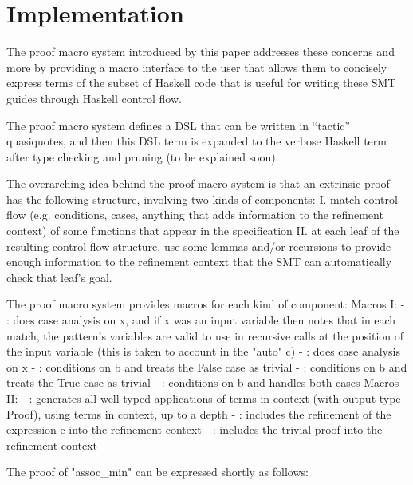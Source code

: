 \section{Implementation}

The proof macro system introduced by this paper addresses these concerns and more by providing a macro interface to the user that allows them to concisely express terms of the subset of Haskell code that is useful for writing these SMT guides through Haskell control flow.

The proof macro system defines a DSL that can be written in ``tactic'' quasiquotes, and then this DSL term is expanded to the verbose Haskell term after type checking and pruning (to be explained soon).

The overarching idea behind the proof macro system is that an extrinsic proof has the following structure, involving two kinds of components:
I. match control flow (e.g. conditions, cases, anything that adds information to the refinement context) of some functions that appear in the specification
II. at each leaf of the resulting control-flow structure, use some lemmas and/or recursions to provide enough information to the refinement context that the SMT can automatically check that leaf's goal.


The proof macro system provides macros for each kind of component:
Macros I:
- : does case analysis on x, and if x was an input variable then notes that in each match, the pattern's variables are valid to use in recursive calls at the position of the input variable (this is taken to account in the "auto" c)
- : does case analysis on x
- : conditions on b and treats the False case as trivial 
- : conditions on b and treats the True case as trivial
- : conditions on b and handles both cases
Macros II:
- : generates all well-typed applications of terms in context (with output type Proof), using terms in context, up to a depth
- : includes the refinement of the expression e into the refinement context
- : includes the trivial proof into the refinement context

The proof of "assoc\_min" can be expressed shortly as follows:


